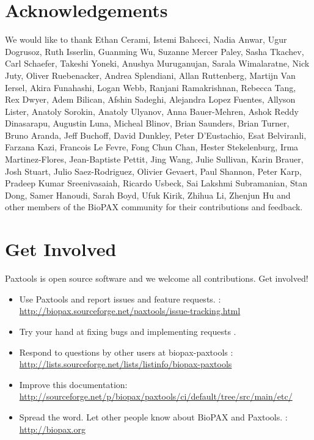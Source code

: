 \documentclass{tufte-book}
\begin{document}
\section{Acknowledgements}
We would like to thank Ethan Cerami, Istemi Bahceci, Nadia Anwar, Ugur Dogrusoz, Ruth Isserlin, Guanming Wu, Suzanne Mercer Paley, Sasha Tkachev, Carl Schaefer, Takeshi Yoneki, Anushya Muruganujan, Sarala Wimalaratne, Nick Juty, Oliver Ruebenacker, Andrea Splendiani, Allan Ruttenberg, Martijn Van Iersel, Akira Funahashi, Logan Webb, Ranjani Ramakrishnan, Rebecca Tang, Rex Dwyer, Adem Bilican, Afshin Sadeghi, Alejandra Lopez Fuentes, Allyson Lister, Anatoly Sorokin, Anatoly Ulyanov, Anna Bauer-Mehren, Ashok Reddy Dinasarapu, Augustin Luna, Micheal Blinov, Brian Saunders, Brian Turner, Bruno Aranda, Jeff Buchoff, David Dunkley, Peter D'Eustachio, Esat Belviranli, Farzana Kazi, Francois Le Fevre, Fong Chun Chan, Hester Stekelenburg, Irma Martinez-Flores, Jean-Baptiste Pettit, Jing Wang, Julie Sullivan, Karin Brauer, Josh Stuart, Julio Saez-Rodriguez, Olivier Gevaert, Paul Shannon, Peter Karp, Pradeep Kumar Sreenivasaiah, Ricardo Usbeck, Sai Lakshmi Subramanian, Stan Dong, Samer Hanoudi, Sarah Boyd, Ufuk Kirik, Zhihua Li, Zhenjun Hu and other members of the  BioPAX community for their contributions and feedback.  
\section{Get Involved}
\begin{fullwidth}
Paxtools is open source software and we welcome all contributions.  Get involved! 
\begin{itemize}
\item Use Paxtools and report issues and feature requests.  : \url{http://biopax.sourceforge.net/paxtools/issue-tracking.html}
\item Try your hand at fixing bugs and implementing requests .
\item Respond to questions by other users at biopax-paxtools :  \url{http://lists.sourceforge.net/lists/listinfo/biopax-paxtools}
\item Improve this documentation:  \url{http://sourceforge.net/p/biopax/paxtools/ci/default/tree/src/main/etc/}
\item Spread the word. Let other people know about BioPAX and Paxtools. : \url{http://biopax.org} 
\end{itemize}
\end{fullwidth}


\end{document}
